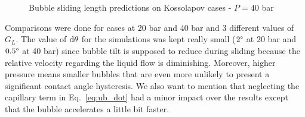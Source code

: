 \begin{figure}[h!]
\begin{center}
\\
\\
	\caption{Bubble sliding length predictions on Kossolapov cases - $P=40$ bar}	
	\label{fig:slide_koss_40bar}
\end{center}
\end{figure}



Comparisons were done for cases at 20 bar and 40 bar and 3 different values of $G_{L}$. The value of $\mathrm{d}\theta$ for the simulations was kept really small ($2 \degree$ at 20 bar and $0.5\degree$ at 40 bar) since bubble tilt is supposed to reduce during sliding because the relative velocity regarding the liquid flow is diminishing. Moreover, higher pressure means smaller bubbles that are even more unlikely to present a significant contact angle hysteresis. We also want to mention that neglecting the capillary term in Eq.~\ref{eq:ub_dot} had a minor impact over the results except that the bubble accelerates a little bit faster. 

